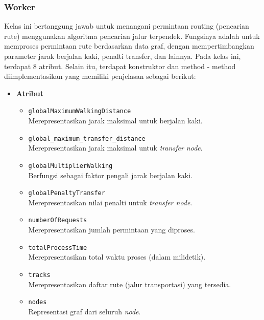 \subsubsection{Worker}
\label{subss:worker}
Kelas ini bertanggung jawab untuk menangani permintaan routing (pencarian rute) menggunakan algoritma pencarian jalur terpendek. Fungsinya adalah untuk memproses permintaan rute berdasarkan data graf, dengan mempertimbangkan parameter jarak berjalan kaki, penalti transfer, dan lainnya. Pada kelas ini, terdapat 8 atribut. Selain itu, terdapat konstruktor dan method - method diimplementasikan yang memiliki penjelasan sebagai berikut:
\begin{itemize}
    \item \textbf{Atribut}
    \begin{itemize}
        \item \texttt{globalMaximumWalkingDistance}
        \\ Merepresentasikan jarak maksimal untuk berjalan kaki.
        \item \texttt{global\_maximum\_transfer\_distance}
        \\ Merepresentasikan jarak maksimal untuk \textit{transfer node}.
        \item \texttt{globalMultiplierWalking}
        \\ Berfungsi sebagai faktor pengali jarak berjalan kaki.
        \item \texttt{globalPenaltyTransfer}
        \\ Merepresentasikan nilai penalti untuk \textit{transfer node}.
        \item \texttt{numberOfRequests}
        \\ Merepresentasikan jumlah permintaan yang diproses.
        \item \texttt{totalProcessTime}
        \\ Merepresentasikan total waktu proses (dalam milidetik).
        \item \texttt{tracks}
        \\ Merepresentasikan daftar rute (jalur transportasi) yang tersedia.
        \item \texttt{nodes}
        \\ Representasi graf dari seluruh \textit{node}.
    \end{itemize}


\end{itemize}
